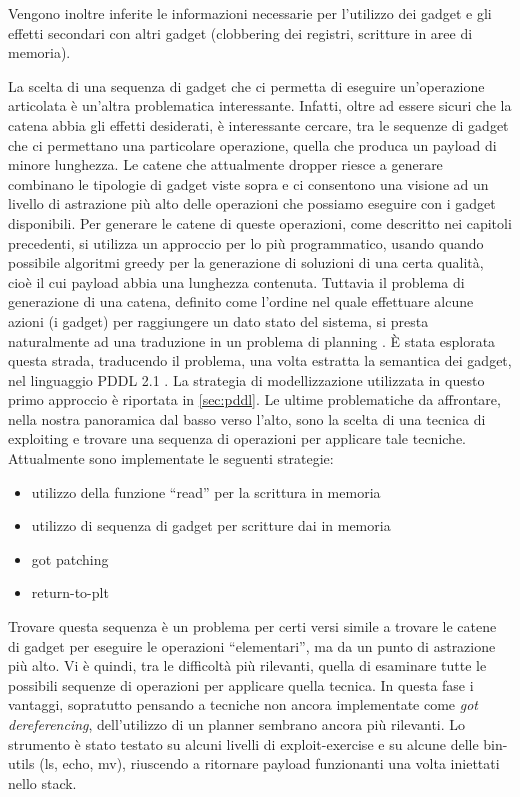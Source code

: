 Vengono inoltre inferite le informazioni necessarie per l'utilizzo dei
gadget e gli effetti secondari con altri gadget (clobbering dei
registri, scritture in aree di memoria).

La scelta di una sequenza di gadget che ci permetta di eseguire
un'operazione articolata è un'altra problematica
interessante. Infatti, oltre ad essere sicuri che la catena abbia gli
effetti desiderati, è interessante cercare, tra le sequenze di gadget
che ci permettano una particolare operazione, quella che produca un
payload di minore lunghezza. Le catene che attualmente dropper riesce
a generare combinano le tipologie di gadget viste sopra e ci
consentono una visione ad un livello di astrazione più alto delle
operazioni che possiamo eseguire con i gadget disponibili. Per
generare le catene di queste operazioni, come descritto nei capitoli
precedenti, si utilizza un approccio per lo più programmatico, usando
quando possibile algoritmi greedy per la generazione di soluzioni di
una certa qualità, cioè il cui payload abbia una lunghezza
contenuta. Tuttavia il problema di generazione di una catena, definito
come l'ordine nel quale effettuare alcune azioni (i gadget) per
raggiungere un dato stato del sistema, si presta naturalmente ad una
traduzione in un problema di planning . È stata esplorata questa
strada, traducendo il problema, una volta estratta la semantica dei
gadget, nel linguaggio PDDL 2.1 \cite{pddl-1997,fox-03}. La strategia
di modellizzazione utilizzata in questo primo approccio è riportata in
\ref{sec:pddl}. Le ultime problematiche da affrontare, nella nostra
panoramica dal basso verso l'alto, sono la scelta di una tecnica di
exploiting e trovare una sequenza di operazioni per applicare tale
tecniche.  Attualmente sono implementate le seguenti strategie:

\begin{itemize}
\item utilizzo della funzione ``read'' per la scrittura in memoria
\item utilizzo di sequenza di gadget per scritture dai in memoria
\item got patching
\item return-to-plt
\end{itemize}

Trovare questa sequenza è un problema per certi versi simile a trovare
le catene di gadget per eseguire le operazioni ``elementari'', ma da un
punto di astrazione più alto.  Vi è quindi, tra le difficoltà più
rilevanti, quella di esaminare tutte le possibili sequenze di
operazioni per applicare quella tecnica. In questa fase i vantaggi,
sopratutto pensando a tecniche non ancora implementate come \emph{got
  dereferencing}, dell'utilizzo di un planner sembrano ancora più
rilevanti. Lo strumento è stato testato su alcuni livelli di
exploit-exercise\cite{exploit-exercise} e su alcune delle bin-utils
(ls, echo, mv), riuscendo a ritornare payload funzionanti una volta
iniettati nello stack.

